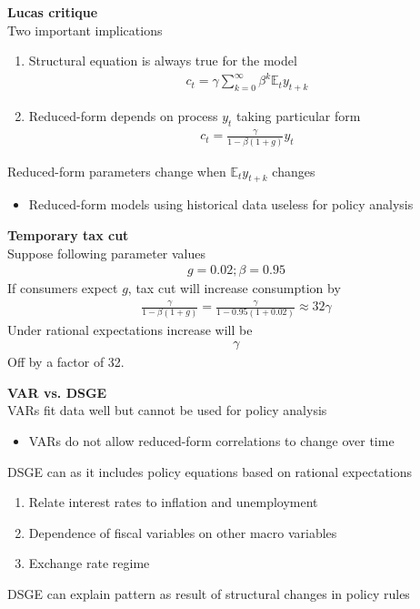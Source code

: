 \documentclass{beamer}
\begin{document}
\begin{frame}  
\textbf{Lucas critique}\\
Two important implications
  \begin{enumerate}
  \item Structural equation is always true for the model
  \begin{align*}
    c_t=\gamma \sum^{\infty}_{k=0}\beta^k \mathbb{E}_ty_{t+k}
  \end{align*}
  \item Reduced-form depends on process $y_t$ taking particular form
  \begin{align*}
    c_t=\frac{\gamma}{1-\beta(1+g)}y_t
  \end{align*}
\end{enumerate}
\medskip
Reduced-form parameters change when $\mathbb{E}_ty_{t+k}$ changes
\begin{itemize}
    \item Reduced-form models using historical data useless for policy analysis
  \end{itemize}
\end{frame}

\begin{frame}
  \textbf{Temporary tax cut}\\
  Suppose following parameter values
  \begin{align*}
    g=0.02;\beta=0.95
  \end{align*}
  \medskip 
  If consumers expect $g$, tax cut will increase consumption by
  \begin{align*}
    \frac{\gamma}{1-\beta(1+g)}=\frac{\gamma}{1-0.95(1+0.02)}\approx 32\gamma
  \end{align*}
  \medskip
  Under rational expectations increase will be
  \begin{align*}
    \gamma
  \end{align*}
  \medskip
  Off by a factor of 32. 
\end{frame}

\begin{frame}
  \textbf{VAR vs. DSGE}\\
  VARs fit data well but cannot be used for policy analysis
  \begin{itemize}
    \item VARs do not allow reduced-form correlations to change over time
  \end{itemize}
  \medskip
  DSGE can as it includes policy equations based on rational expectations
  \begin{enumerate}[i]
      \item Relate interest rates to inflation and unemployment
      \item Dependence of fiscal variables on other macro variables
      \item Exchange rate regime
  \end{enumerate}    
  \medskip
  DSGE can explain pattern as result of structural changes in policy rules
\end{frame}
\end{document}
